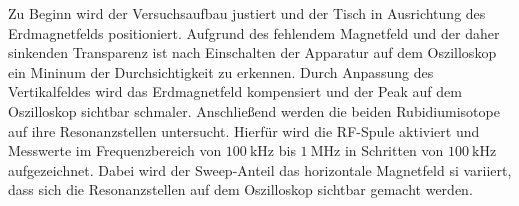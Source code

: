 Zu Beginn wird der Versuchsaufbau justiert und der Tisch in Ausrichtung des Erdmagnetfelds positioniert. 
Aufgrund des fehlendem Magnetfeld und der daher sinkenden Transparenz
ist nach Einschalten der Apparatur auf dem Oszilloskop ein Mininum der Durchsichtigkeit zu erkennen.
Durch Anpassung des Vertikalfeldes wird das Erdmagnetfeld kompensiert und der Peak auf dem Oszilloskop sichtbar schmaler. 
Anschließend werden die beiden Rubidiumisotope auf ihre Resonanzstellen untersucht. 
Hierfür wird die RF-Spule aktiviert und Messwerte im Frequenzbereich 
von $\SI{100}{\kilo\hertz}$ bis $\SI{1}{\mega\hertz}$ in Schritten von $\SI{100}{\kilo\hertz}$ aufgezeichnet.
Dabei wird der Sweep-Anteil das horizontale Magnetfeld si variiert,
dass sich die Resonanzstellen auf dem Oszilloskop sichtbar gemacht werden.
